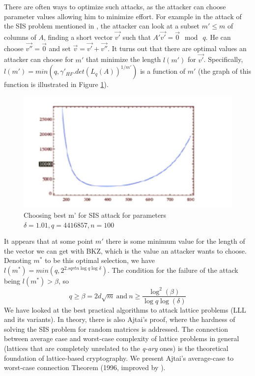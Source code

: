 There are often ways to optimize such attacks, as the attacker can choose parameter values allowing him to minimize effort. For example in the attack of the SIS problem mentioned in
\cite{micciancio2008lattice}, the attacker can look at a subset $m' \leq m$ of
columns of $A$, finding a short vector $\vec{v'}$ such that
$A'\vec{v'} = \vec{0} \mod \ q$. He can choose $\vec{v''} = \vec{0}$ and set
$\vec{v} = \vec{v'} + \vec{v''}$. It turns out that there are optimal values an attacker can choose for $m'$ that minimize the length $l(m')$ for
$\vec{v'}$.  Specifically, $l(m') = min(q,\gamma'_{HF}.det(L_q(A))^{1/m'})$ is a
function of $m'$ (the graph of this function is illustrated in Figure
\ref{fig:bestAttack}).
\begin{figure}[h]
  \centering \includegraphics[scale=0.3]{bestattack}
  \caption{Choosing best m' for SIS attack for parameters
    $\delta = 1.01, q=4416857, n=100$}
  \label{fig:bestAttack}
\end{figure}
It appears that at some point $m'$ there is some minimum value for the length of
the vector we can get with BKZ, which is the value an attacker wants to
choose. Denoting $m^*$ to be this optimal selection, we have
$l(m^*) = min(q, 2^{2.sqrt{n\log q\log \delta}})$. The condition for the failure of the attack being $l(m^*) > \beta$, so
\[
  q \geq \beta = 2d\sqrt{m} \ \text{and}\ n \geq \frac{\log^2(\beta)}{\log q
    \log(\delta)}
\]
We have looked at the best practical algorithms to attack lattice problems (LLL
and its variants). In theory, there is also Ajtai's proof, where the hardness of solving the SIS problem for random matrices is addressed. The connection between average case and  worst-case complexity of lattice problems in general (lattices that are completely unrelated
to the \emph{q-ary} ones) is the theoretical foundation of lattice-based
cryptography. We present Ajtai's average-case to worst-case connection Theorem
(1996, improved by \cite{gentry2008trapdoors}).


